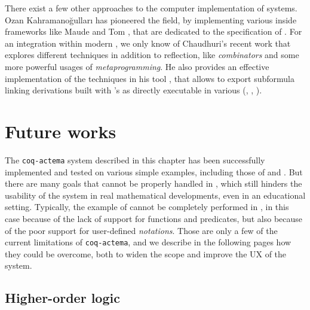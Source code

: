 \begin{remark}
  There exist a few other approaches to the computer implementation of  systems. Ozan Kahramanoğulları has pioneered the field, by
  implementing various  inside frameworks like Maude
  \cite{kahramanogullari_maude_2008} and Tom
  \cite{kahramanogullari_implementing_2005}, that are dedicated to the
  specification of . For an integration within modern
  , we only know of Chaudhuri's recent work
   that explores different techniques in
  addition to reflection, like \emph{combinators} and some more powerful usages
  of \emph{metaprogramming}. He also provides an effective implementation of the
  techniques in his  tool \cite{DBLP:conf/cade/Chaudhuri21}, that
  allows to export subformula linking derivations built with 's
   as  directly executable in various  (, , ).
\end{remark}

\section{Future works}

The \texttt{coq-actema} system described in this chapter has been successfully
implemented and tested on various simple examples, including those of
 and . But there are many  goals that cannot be
properly handled in , which still hinders the usability of the system in
real mathematical developments, even in an educational setting. Typically, the
example of  cannot be completely performed in , in this case
because of the lack of support for \emph{} functions and predicates,
but also because of the poor support for user-defined \emph{notations}. Those
are only a few of the current limitations of \texttt{coq-actema}, and we
describe in the following pages how they could be overcome, both to widen the
scope and improve the UX of the system.

\subsection{Higher-order logic}


